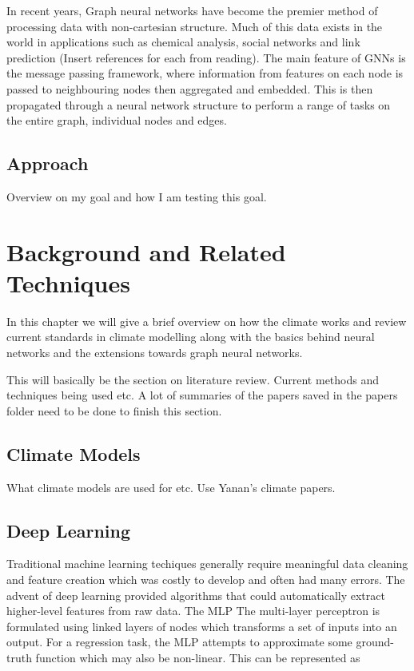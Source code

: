 \documentclass[honours,12pt]{unswthesis}
\numberwithin{equation}{section}
\begin{document}
{\noindent} In recent years, Graph neural networks have become the premier method of processing data with non-cartesian structure. Much of this data exists in the world
in applications such as chemical analysis, social networks and link prediction (Insert references for each from reading). The main feature of GNNs is the message passing framework,
where information from features on each node is passed to neighbouring nodes then aggregated and embedded. This is then propagated through a neural network structure to
perform a range of tasks on the entire graph, individual nodes and edges.        

{\section{Approach}}\label{approach}
Overview on my goal and how I am testing this goal. 


\chapter{Background and Related Techniques}



In this chapter we will give a brief overview on how the climate works and review 
current standards in climate modelling along with the basics
behind neural networks and the extensions towards graph neural networks.

This will basically be the section on literature review. Current methods and techniques being
used etc. A lot of summaries of the papers saved in the papers folder need to be done to 
finish this section.


\section{Climate Models}\label{climate}
What climate models are used for etc.
Use Yanan's climate papers.


\section{Deep Learning}\label{nn}
Traditional machine learning techiques generally require meaningful data cleaning and feature creation which was costly to develop and 
often had many errors. The advent of deep learning provided algorithms that could automatically extract higher-level features from raw data.\cite{deng-deep-learning} The MLP 
The multi-layer perceptron\cite{rumelhart1986learning} is formulated using linked layers of nodes which transforms a set of inputs into an output. For a regression task,
the MLP attempts to approximate some ground-truth function which may also be non-linear. This can be represented as
\end{document}
